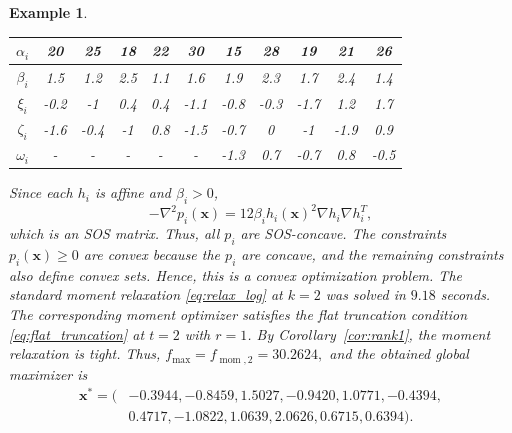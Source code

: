 \documentclass[pdflatex,sn-mathphys-num]{sn-jnl}%
\newcommand{\rd}[1]{{\color{red}#1}}
\newcommand{\vect}[1]{\boldsymbol{#1}}
\theoremstyle{thmstyleone}%
\theoremstyle{thmstyletwo}%
\newtheorem{example}{Example}%
\theoremstyle{thmstylethree}%
\begin{document}
\begin{example}
\begin{table}[htb]
\begin{tabular}{|c|c|c|c|c|c|c|c|c|c|c|}
			$\alpha_i$ & 20 & 25 & 18 & 22 & 30 & 15 & 28 & 19 & 21 & 26 \\ \hline
			$\beta_i$ & 1.5 & 1.2 & 2.5 & 1.1 & 1.6 & 1.9 & 2.3 & 1.7 & 2.4 & 1.4 \\ \hline
			$\xi_i$ & -0.2 & -1 & 0.4 & 0.4 & -1.1 & -0.8 & -0.3 & -1.7 & 1.2 & 1.7 \\ \hline
			$\zeta_i$ & -1.6 & -0.4 & -1 & 0.8 & -1.5 & -0.7 & 0 & -1 & -1.9 & 0.9 \\ \hline
			$\omega_i$ & - & - & - & - & - & -1.3 & 0.7 & -0.7 & 0.8 & -0.5 \\ \hline
		\end{tabular}
	\end{table}
	\rd{Since each $h_i$ is affine and $\beta_i>0$,
	\[
	-\nabla^2p_i(\vect{x})
	=12\beta_i h_i(\vect{x})^2
	\nabla h_i\nabla h_i^T,
	\]
	which is an SOS matrix. Thus, all $p_i$ are SOS-concave.
	The constraints $p_i(\vect{x})\geq0$ are convex because the $p_i$
	are concave, and the remaining constraints also define convex sets.
	Hence, this is a convex optimization problem.}
	\rd{The standard moment relaxation \eqref{eq:relax_log} at $k=2$
	was solved in $9.18$ seconds.}
	The corresponding moment optimizer satisfies the flat truncation
condition \eqref{eq:flat_truncation} at $t=2$ with $r=1$.
By Corollary~\ref{cor:rank1}, the moment relaxation is tight. 
Thus,
	$
	f_{\max} = f_{\operatorname{mom},2} = 30.2624,
	$
	and the obtained global maximizer is 
	\begin{equation*}
	\begin{array}{rl}
		\vect{x}^* = (& -0.3944, -0.8459, 1.5027, -0.9420, 1.0771, -0.4394,\\
		& 0.4717, -1.0822, 1.0639, 2.0626, 0.6715, 0.6394).
	\end{array}
\end{equation*}
\end{example}
\end{document}
